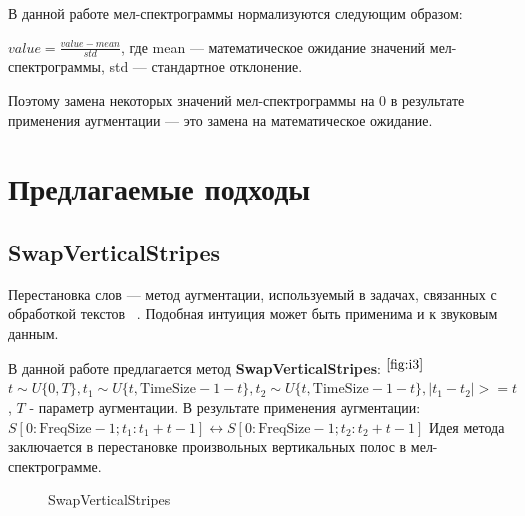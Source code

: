 \documentclass[12pt, fleqn]{article}
\begin{document}
В данной работе мел-спектрограммы нормализуются следующим образом: 

$ value = \frac{value - mean}{std}$, где mean --- математическое ожидание значений мел-спектрограммы, std --- стандартное отклонение. 

Поэтому замена некоторых значений мел-спектрограммы на 0 в результате применения аугментации --- это замена на математическое ожидание.

\section{Предлагаемые подходы}

\subsection{SwapVerticalStripes}

Перестановка слов --- метод аугментации, используемый в задачах, связанных с обработкой текстов ~\cite{RandomSwap}. Подобная интуиция может быть применима и к звуковым данным. 

В данной работе предлагается метод \textbf{SwapVerticalStripes}: $^{\ref{fig:i3}}$ \newline
$t \sim U\{0, T\}, t_1 \sim U\{t, \text{TimeSize} - 1 - t\}, t_2 \sim U\{t, \text{TimeSize} - 1 - t\}, |t_1 - t_2| >= t $, \newline $T$ - параметр аугментации. \newline 
В результате применения аугментации: \newline
$S[0:\text{FreqSize} - 1; t_1: t_1 + t - 1] \leftrightarrow S[0:\text{FreqSize} - 1; t_2 : t_2 + t - 1]$ \newline
Идея метода заключается в перестановке произвольных вертикальных полос в мел-спектрограмме.
\begin{figure}[ht!]
	\caption{SwapVerticalStripes}
	\label{fig:i3}
\end{figure}
\end{document}
